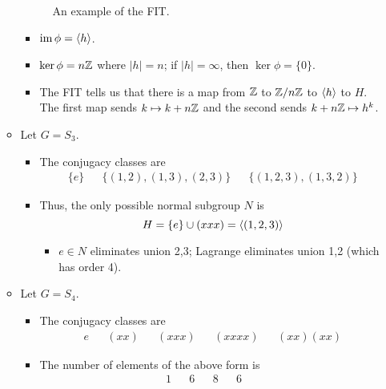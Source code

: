 \documentclass[../notes.tex]{subfiles}
\begin{document}
\begin{itemize}
\begin{itemize}
\begin{figure}[h!]
            \caption{An example of the FIT.}
            \label{fig:FITexample}
        \end{figure}
        \begin{itemize}
            \item $\operatorname{im}\phi=\left\langle{h}\right\rangle$.
            \item $\ker\phi=n\mathbb{Z}$ where $|h|=n$; if $|h|=\infty$, then $\ker\phi=\{0\}$.
            \item The FIT tells us that there is a map from $\mathbb{Z}$ to $\mathbb{Z}/n\mathbb{Z}$ to $\left\langle{h}\right\rangle$ to $H$. The first map sends $k\mapsto k+n\mathbb{Z}$ and the second sends $k+n\mathbb{Z}\mapsto h^k$.
        \end{itemize}
        \item Let $G=S_3$.
        \begin{itemize}
            \item The conjugacy classes are
            \begin{align*}
                \{e\}&&
                \{(1,2),(1,3),(2,3)\}&&
                \{(1,2,3),(1,3,2)\}
            \end{align*}
            \item Thus, the only possible normal subgroup $N$ is
            \begin{equation*}
                H = \{e\}\cup(xxx)
                = \left\langle{(1,2,3)}\right\rangle
            \end{equation*}
            \begin{itemize}
                \item $e\in N$ eliminates union 2,3; Lagrange eliminates union 1,2 (which has order 4).
            \end{itemize}
        \end{itemize}
        \item Let $G=S_4$.
        \begin{itemize}
            \item The conjugacy classes are
            \begin{align*}
                e&&
                (xx)&&
                (xxx)&&
                (xxxx)&&
                (xx)(xx)
            \end{align*}
            \item The number of elements of the above form is
            \begin{align*}
                1&&
                6&&
                8&&
                6&&

\end{align*}
\end{itemize}
\end{itemize}
\end{itemize}
\end{document}
